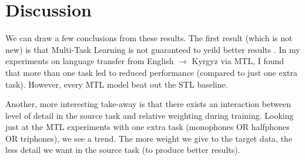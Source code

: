 \documentclass[a4paper]{article}
\begin{document}





\section{Discussion}

We can draw a few conclusions from these results. The first result (which is not new) is that Multi-Task Learning is not guaranteed to yeild better results \cite{caruana1997}. In my experiments on language transfer from English $\rightarrow$ Kyrgyz via MTL, I found that more than one task led to reduced performance (compared to just one extra task). However, every MTL model beat out the STL baseline.

Another, more interesting take-away is that there exists an interaction between level of detail in the source task and relative weighting during training. Looking just at the MTL experiments with one extra task (monophones OR halfphones OR triphones), we see a trend. The more weight we give to the target data, the less detail we want in the source task (to produce better results).
\end{document}

